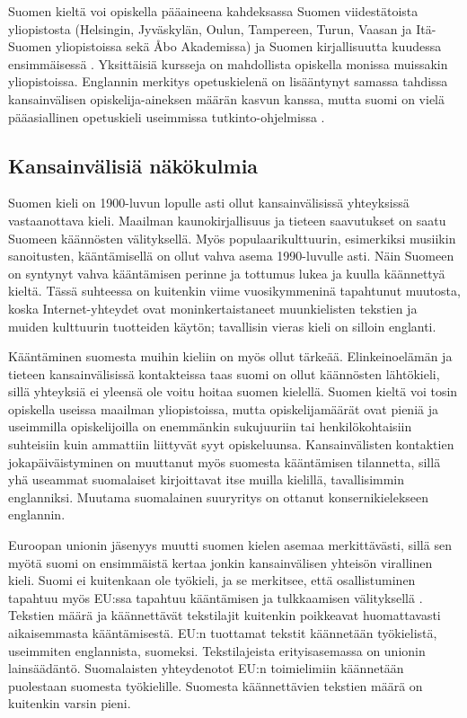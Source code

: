 \documentclass[]{../../metanetpaper}
\begin{document}
\begin{multicols}{2}
Suomen kieltä voi opiskella pääaineena kahdeksassa Suomen viidestätoista
yliopistosta (Helsingin, Jyväskylän, Oulun, Tampereen, Turun, Vaasan
ja Itä-Suomen yliopistoissa sekä Åbo Akademissa) ja Suomen kirjallisuutta
kuudessa ensimmäisessä \cite{hum-ulko}. Yksittäisiä kursseja on mahdollista 
opiskella monissa muissakin yliopistoissa. Englannin merkitys opetuskielenä on
lisääntynyt samassa tahdissa kansainvälisen opiskelija-aineksen määrän
kasvun kanssa, mutta suomi on vielä pääasiallinen opetuskieli
useimmissa tutkinto-ohjelmissa \cite{Board}.



\subsection{Kansainvälisiä näkökulmia}


Suomen kieli on 1900-luvun lopulle asti ollut kansainvälisissä
yhteyksissä vastaanottava kieli. Maailman kaunokirjallisuus ja tieteen
saavutukset on saatu Suomeen käännösten välityksellä. Myös
populaarikulttuurin, esimerkiksi musiikin sanoitusten, kääntämisellä
on ollut vahva asema 1990-luvulle asti. Näin Suomeen on syntynyt vahva
kääntämisen perinne ja tottumus lukea ja kuulla käännettyä
kieltä. Tässä suhteessa on kuitenkin viime vuosikymmeninä tapahtunut
muutosta, koska Internet-yhteydet ovat moninkertaistaneet
muunkielisten tekstien ja muiden kulttuurin tuotteiden käytön;
tavallisin vieras kieli on silloin englanti.

Kääntäminen suomesta muihin kieliin on myös ollut
tärkeää. Elinkeinoelämän ja tieteen kansainvälisissä kontakteissa taas
suomi on ollut käännösten lähtökieli, sillä yhteyksiä ei yleensä ole
voitu hoitaa suomen kielellä. Suomen kieltä voi tosin opiskella
useissa maailman yliopistoissa, mutta opiskelijamäärät ovat pieniä ja
useimmilla opiskelijoilla on enemmänkin sukujuuriin tai
henkilökohtaisiin suhteisiin kuin ammattiin liittyvät syyt
opiskeluunsa. Kansainvälisten kontaktien jokapäiväistyminen on
muuttanut myös suomesta kääntämisen tilannetta, sillä yhä useammat
suomalaiset kirjoittavat itse muilla kielillä, tavallisimmin
englanniksi. Muutama suomalainen suuryritys on ottanut
konsernikielekseen englannin.

Euroopan unionin jäsenyys muutti suomen kielen asemaa merkittävästi,
sillä sen myötä suomi on ensimmäistä kertaa jonkin kansainvälisen
yhteisön virallinen kieli. Suomi ei kuitenkaan ole työkieli, ja se
merkitsee, että osallistuminen tapahtuu myös EU:ssa tapahtuu
kääntämisen ja tulkkaamisen välityksellä \cite{Tulevaisuus2009}.
Tekstien määrä ja käännettävät tekstilajit kuitenkin poikkeavat
huomattavasti aikaisemmasta kääntämisestä. EU:n tuottamat tekstit
käännetään työkielistä, useimmiten englannista, suomeksi.
Tekstilajeista erityisasemassa on unionin lainsäädäntö. Suomalaisten
yhteydenotot EU:n toimielimiin käännetään puolestaan suomesta
työkielille. Suomesta käännettävien tekstien määrä on kuitenkin varsin
pieni.


\end{multicols}
\end{document}
